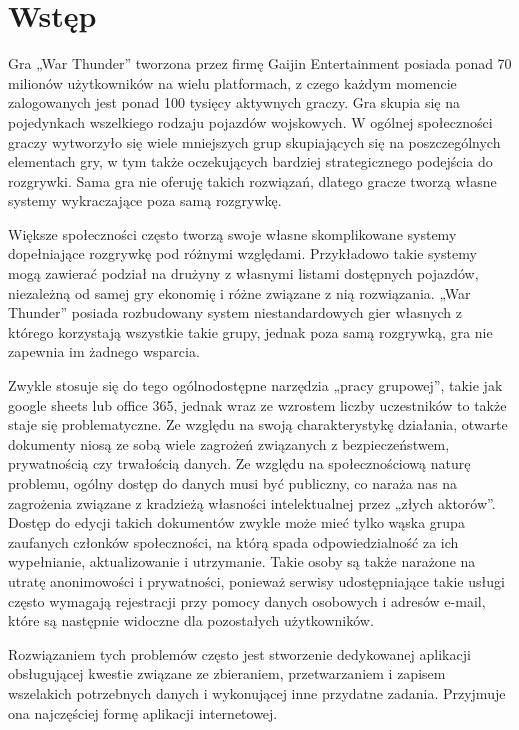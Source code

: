\chapter{Wstęp}
\label{cha:wstep}

    Gra „War Thunder” tworzona przez firmę Gaijin Entertainment posiada ponad 70 milionów użytkowników na wielu platformach, z czego każdym momencie zalogowanych jest ponad 100 tysięcy aktywnych graczy. Gra skupia się na pojedynkach wszelkiego rodzaju pojazdów wojskowych. W ogólnej społeczności graczy wytworzyło się wiele mniejszych grup skupiających się na poszczególnych elementach gry, w tym także oczekujących bardziej strategicznego podejścia do rozgrywki. Sama gra nie oferuję takich rozwiązań, dlatego gracze tworzą własne systemy wykraczające poza samą rozgrywkę.

    Większe społeczności często tworzą swoje własne skomplikowane systemy dopełniające rozgrywkę pod różnymi względami. Przykładowo takie systemy mogą zawierać podział na drużyny z własnymi listami dostępnych pojazdów, niezależną od samej gry ekonomię i różne związane z nią rozwiązania. „War Thunder” posiada rozbudowany system niestandardowych gier własnych z którego korzystają wszystkie takie grupy, jednak poza samą rozgrywką, gra nie zapewnia im żadnego wsparcia.
    
	Zwykle stosuje się do tego ogólnodostępne narzędzia „pracy grupowej”, takie jak google sheets lub office 365, jednak wraz ze wzrostem liczby uczestników to także staje się problematyczne. Ze względu na swoją charakterystykę działania, otwarte dokumenty niosą ze sobą wiele zagrożeń związanych z bezpieczeństwem, prywatnością czy trwałością danych. Ze względu na społecznościową naturę problemu, ogólny dostęp do danych musi być publiczny, co naraża nas na zagrożenia związane z kradzieżą własności intelektualnej przez „złych aktorów”. Dostęp do edycji takich dokumentów zwykle może mieć tylko wąska grupa zaufanych członków społeczności, na którą spada odpowiedzialność za ich wypełnianie, aktualizowanie i utrzymanie. Takie osoby są także narażone na utratę anonimowości i prywatności, ponieważ serwisy udostępniające takie usługi często wymagają rejestracji przy pomocy danych osobowych i adresów e-mail, które są następnie widoczne dla pozostałych użytkowników.				
 
 	Rozwiązaniem tych problemów często jest stworzenie dedykowanej aplikacji obsługującej kwestie związane ze zbieraniem, przetwarzaniem i zapisem wszelakich potrzebnych danych i wykonującej inne przydatne zadania. Przyjmuje ona najczęściej formę aplikacji internetowej.

